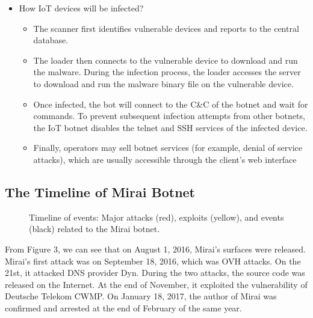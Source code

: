\documentclass[conference]{IEEEtran}
\begin{document}
\begin{itemize}
\begin{itemize}
\item {Malware's servers}\\
Malware servers host resources used by the botnet such
as shell scripts and executable binaries.\cite{b3}}
\end{itemize}

\item{How IoT devices will be infected?}

\begin{itemize}
\item{ The scanner first identifies vulnerable devices and reports to the central database.}
\item{The loader then connects to the vulnerable device to download and run the malware. During the infection process, the loader accesses the server to download and run the malware binary file on the vulnerable device. }
\item{Once infected, the bot will connect to the C\&C of the botnet and wait for commands. To prevent subsequent infection attempts from other botnets, the IoT botnet disables the telnet and SSH services of the infected device. }
\item{Finally, operators may sell botnet services (for example, denial of service attacks), which are usually accessible through the client’s web interface }

\end{itemize}
\end{itemize}

\subsection{\textbf{The Timeline of Mirai Botnet }}

\begin{figure}[htbp]
{}
\caption{Timeline of events: Major attacks (red), exploits (yellow), and events (black) related to the Mirai botnet.\cite{b1}}
\label{fig}
\end{figure}
From Figure 3\cite{b1}, we can see that on August 1, 2016, Mirai’s surfaces were released. Mirai’s first attack was on September 18, 2016, which was OVH attacks. On the 21st, it attacked DNS provider Dyn. During the two attacks, the source code was released on the Internet. At the end of November, it exploited the vulnerability of Deutsche Telekom CWMP. On January 18, 2017, the author of Mirai was confirmed and arrested at the end of February of the same year.
\end{document}
